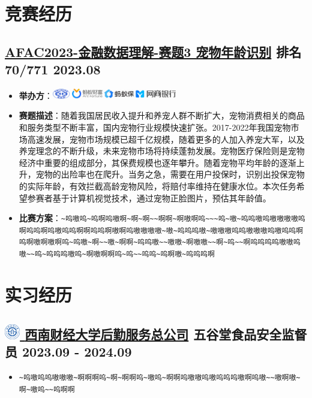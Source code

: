 \documentclass{resume}
\begin{document}
\section[竞赛经历]{ \textbf{\color{mainColor}竞赛经历}}


\subsection[AFAC2023-金融数据理解-赛题3 宠物年龄识别]{\href{https://tianchi.aliyun.com/competition/entrance/532092}{\textbf{AFAC2023-金融数据理解-赛题3 宠物年龄识别}} \quad 排名70/771 \hfill {\small 2023.08}}
\begin{itemize}
    \item \textbf{举办方}：\includegraphics[align=c, height=1.2em]{img/AFAC2023-金融数据理解-赛题3 宠物年龄识别举办方.png}
    \item \textbf{赛题描述}：随着我国居民收入提升和养宠人群不断扩大，宠物消费相关的商品和服务类型不断丰富，国内宠物行业规模快速扩张。2017-2022年我国宠物市场高速发展，宠物市场规模已超千亿规模，随着更多的人加入养宠大军，以及养宠理念的不断升级，未来宠物市场将持续蓬勃发展。宠物医疗保险则是宠物经济中重要的组成部分，其保费规模也逐年攀升。随着宠物平均年龄的逐渐上升，宠物的出险率也在爬升。当务之急，需要在用户投保时，识别出投保宠物的实际年龄，有效拦截高龄宠物风险，将赔付率维持在健康水位。本次任务希望参赛者基于计算机视觉技术，通过宠物正脸图片，预估其年龄值。
    \item \textbf{比赛方案}：\lstinline|~呜嗷呜~呜啊呜嗷啊~啊~啊~~啊啊~啊嗷啊呜~~~呜~嗷~呜呜嗷呜嗷嗷嗷嗷呜啊呜呜啊呜嗷呜呜啊啊呜呜啊嗷啊呜嗷嗷嗷嗷~嗷~呜呜呜嗷~嗷嗷嗷呜呜嗷嗷嗷呜嗷呜呜啊呜啊嗷啊嗷啊呜~呜嗷~啊~~嗷~啊啊~呜呜嗷~~嗷嗷~啊嗷嗷~~啊~呜~~啊呜呜呜呜嗷嗷呜嗷~~呜~呜呜呜嗷呜~啊嗷啊啊呜~呜~~呜呜~呜啊嗷~呜呜呜啊|
\end{itemize}
\section[实习经历]{ \textbf{\color{mainColor}实习经历}}

\subsection[西南财经大学后勤服务总公司]{\href{https://houqin.swufe.edu.cn/}{\includegraphics[align=c, height=1.2em]{img/swufe-logo.pdf} \textbf{西南财经大学后勤服务总公司}} \quad 五谷堂食品安全监督员 \hfill {\small 2023.09 - 2024.09}}
\begin{itemize}
    \item \lstinline|~呜嗷呜呜嗷嗷嗷~啊啊啊呜~啊~啊啊呜~嗷呜~啊啊呜嗷嗷呜嗷呜呜呜嗷啊呜嗷~~嗷啊嗷~啊~嗷呜~~呜啊啊|
\end{itemize}
\end{document}
